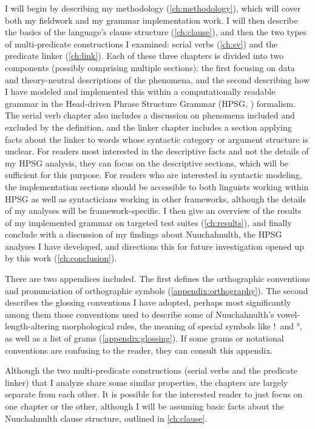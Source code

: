 I will begin by describing my methodology (\cref{ch:methodology}), which will cover both my fieldwork and my grammar implementation work. I will then describe the basics of the language's clause structure (\cref{ch:clause}), and then the two types of multi-predicate constructions I examined: serial verbs (\cref{ch:sv}) and the predicate linker (\cref{ch:link}). Each of these three chapters is divided into two components (possibly comprising multiple sections): the first focusing on data and theory-neutral descriptions of the phenomena, and the second describing how I have modeled and implemented this within a computationally readable grammar in the Head-driven Phrase Structure Grammar (HPSG, \citealt{pollardsag1994}) formalism. The serial verb chapter also includes a discussion on phenomena included and excluded by the definition, and the linker chapter includes a section applying facts about the linker to words whose syntactic category or argument structure is unclear. For readers most interested in the descriptive facts and not the details of my HPSG analysis, they can focus on the descriptive sections, which will be sufficient for this purpose. For readers who are interested in syntactic modeling, the implementation sections should be accessible to both linguists working within HPSG as well as syntacticians working in other frameworks, although the details of my analyses will be framework-specific. I then give an overview of the results of my implemented grammar on targeted test suites (\cref{ch:results}), and finally conclude with a discussion of my findings about Nuuchahnulth, the HPSG analyses I have developed, and directions this for future investigation opened up by this work (\cref{ch:conclusion}).

There are two appendices included. The first defines the orthographic conventions and pronunciation of orthographic symbols (\cref{appendix:orthography}). The second describes the glossing conventions I have adopted, perhaps most significantly among them those conventions used to describe some of Nuuchahnulth's vowel-length-altering morphological rules, the meaning of special symbols like !\ and °, as well as a list of grams (\cref{appendix:glossing}). If some grams or notational conventions are confusing to the reader, they can consult this appendix.

Although the two multi-predicate constructions (serial verbs and the predicate linker) that I analyze share some similar properties, the chapters are largely separate from each other. It is possible for the interested reader to just focus on one chapter or the other, although I will be assuming basic facts about the Nuuchahnulth clause structure, outlined in \cref{ch:clause}.